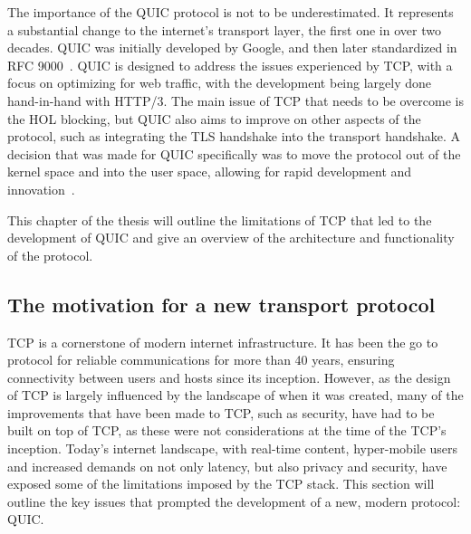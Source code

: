 \documentclass[english, 12pt, a4paper, elec, utf8, a-2b, online]{aaltothesis}
\begin{document}
The importance of the QUIC protocol is not to be underestimated. It represents
a substantial change to the internet's transport layer, the first one in over
two decades. QUIC was initially developed by Google, and then later standardized
in RFC 9000~\cite{rfc9000}. QUIC is designed to address the issues experienced
by TCP, with a focus on optimizing for web traffic, with the development being
largely done hand-in-hand with HTTP/3. The main issue of TCP that needs to be overcome is the
HOL blocking, but  QUIC also aims to improve on other aspects of the protocol,
such as integrating the TLS handshake into the transport handshake. A decision
that was made for QUIC specifically was to move the protocol out of the kernel
space and into the user space, allowing for rapid development and innovation~\cite{quic_transport_protocol_design}.

This chapter of the thesis will outline the limitations of TCP that led to the
development of QUIC and give an overview of the architecture and functionality of
the protocol.

\subsection{The motivation for a new transport protocol \label{quic_motivation}}
TCP is a cornerstone of modern internet infrastructure. It has been the go to
protocol for reliable communications for more than 40 years, ensuring connectivity between users and hosts
since its inception. However, as the design of TCP is largely influenced by the
landscape of when it was created, many of the improvements that have been made to TCP,
such as security, have had to be built on top of TCP, as these were not considerations
at the time of the TCP's inception. Today's internet landscape, with real-time content,
hyper-mobile users and increased demands on not only latency, but also privacy and security, have exposed
some of the limitations imposed by the TCP stack. This section will outline the
key issues that prompted the development of a new, modern protocol: QUIC.
\end{document}
